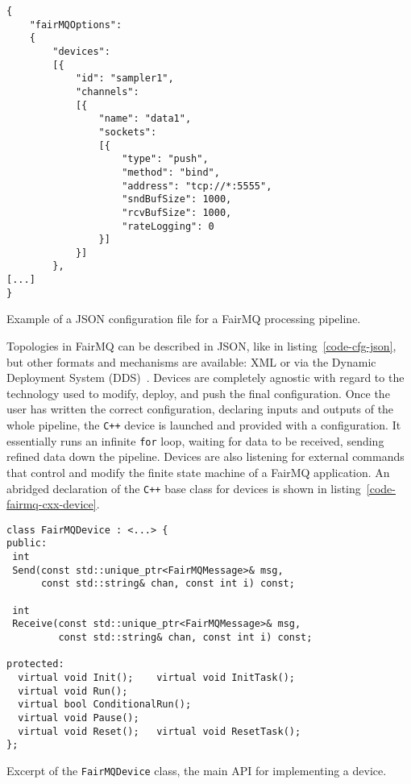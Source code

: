 \documentclass{webofc}
\begin{document}
\begin{listing}[h]
\centering
\begin{verbatim}
{
    "fairMQOptions":
    {
        "devices":
        [{
            "id": "sampler1",
            "channels":
			[{
                "name": "data1",
                "sockets":
				[{
                    "type": "push",
                    "method": "bind",
                    "address": "tcp://*:5555",
                    "sndBufSize": 1000,
                    "rcvBufSize": 1000,
                    "rateLogging": 0
                }]
            }]
        },
[...]
}
\end{verbatim}
\caption{Example of a JSON configuration file for a FairMQ processing pipeline.}
\label{code-cfg-json}       %
\end{listing}

Topologies in FairMQ can be described in JSON, like in listing~\ref{code-cfg-json}, but other formats and mechanisms are available: XML or via the Dynamic Deployment System (DDS)~\cite{ref-dds}.
Devices are completely agnostic with regard to the technology used to modify, deploy, and push the final configuration.
Once the user has written the correct configuration, declaring inputs and outputs of the whole pipeline, the \texttt{C++} device is launched and provided with a configuration.
It essentially runs an infinite \texttt{for} loop, waiting for data to be received, sending refined data down the pipeline.
Devices are also listening for external commands that control and modify the finite state machine of a FairMQ application.
An abridged declaration of the \texttt{C++} base class for devices is shown in listing~\ref{code-fairmq-cxx-device}.

\begin{listing}[h]
\centering
\begin{verbatim}
class FairMQDevice : <...> {
public:
 int
 Send(const std::unique_ptr<FairMQMessage>& msg,
      const std::string& chan, const int i) const;

 int
 Receive(const std::unique_ptr<FairMQMessage>& msg,
         const std::string& chan, const int i) const;

protected:
  virtual void Init();    virtual void InitTask();
  virtual void Run();
  virtual bool ConditionalRun();
  virtual void Pause();
  virtual void Reset();   virtual void ResetTask();
};
\end{verbatim}
\caption{Excerpt of the \texttt{FairMQDevice} class, the main API for implementing a device.}
\label{code-fairmq-cxx-device}
\end{listing}
\end{document}
